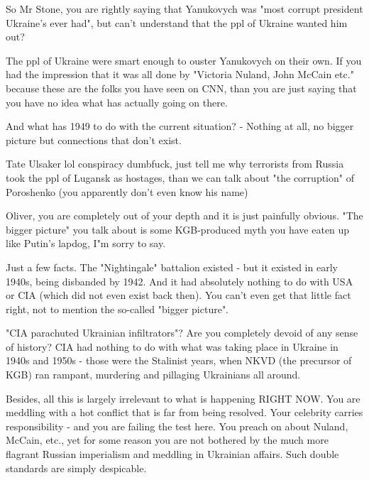 \begin{itemize}
\begin{itemize}
\end{itemize} %


So Mr Stone, you are rightly saying that Yanukovych was "most corrupt president
Ukraine’s ever had", but can't understand that the ppl of Ukraine wanted him
out?

The ppl of Ukraine were smart enough to ouster Yanukovych on their own. If you
had the impression that it was all done by "Victoria Nuland, John McCain etc."
because these are the folks you have seen on CNN, than you are just saying that
you have no idea what has actually going on there.

And what has 1949 to do with the current situation? - Nothing at all, no bigger
picture but connections that don't exist.

\begin{itemize} %
Tate Ulsaker lol conspiracy dumbfuck, just tell me why terrorists from Russia took the ppl of Lugansk as hostages, than we can talk about "the corruption" of Poroshenko (you apparently don't even know his name)
\end{itemize} %


Oliver, you are completely out of your depth and it is just painfully obvious.
"The bigger picture" you talk about is some KGB-produced myth you have eaten up
like Putin's lapdog, I"m sorry to say.

Just a few facts. The "Nightingale" battalion existed - but it existed in early
1940s, being disbanded by 1942. And it had absolutely nothing to do with USA or
CIA (which did not even exist back then). You can't even get that little fact
right, not to mention the so-called "bigger picture".

"CIA parachuted Ukrainian infiltrators"? Are you completely devoid of any sense
of history? CIA had nothing to do with what was taking place in Ukraine in
1940s and 1950s - those were the Stalinist years, when NKVD (the precursor of
KGB) ran rampant, murdering and pillaging Ukrainians all around.

Besides, all this is largely irrelevant to what is happening RIGHT NOW. You are
meddling with a hot conflict that is far from being resolved. Your celebrity
carries responsibility - and you are failing the test here. You preach on about
Nuland, McCain, etc., yet for some reason you are not bothered by the much more
flagrant Russian imperialism and meddling in Ukrainian affairs. Such double
standards are simply despicable.


\end{itemize}
